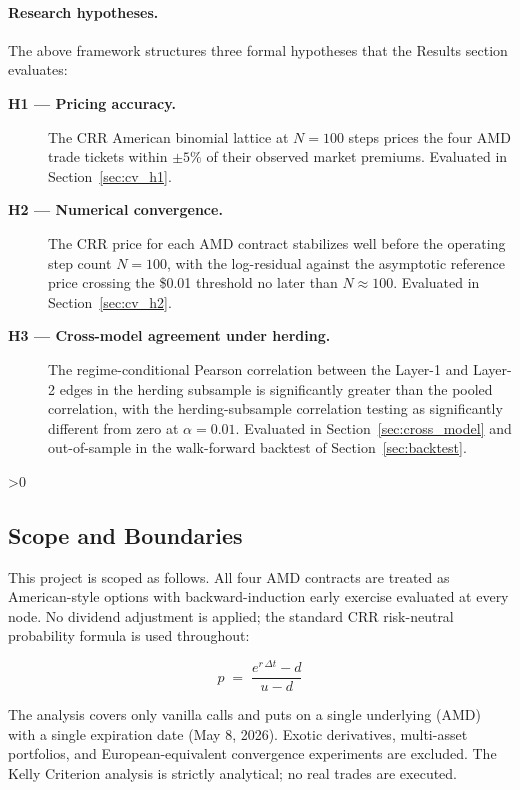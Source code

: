 \documentclass[12pt, letterpaper]{article}
\let\oldsubsection\subsection
\renewcommand{\subsection}{%
  \ifnum\value{subsection}>0 \clearpage\fi
  \oldsubsection
}
\begin{document}
\paragraph{Research hypotheses.} The above framework structures three
formal hypotheses that the Results section evaluates:
\begin{description}
  \item[\textbf{H1 --- Pricing accuracy.}] The CRR American binomial
        lattice at $N = 100$ steps prices the four AMD trade tickets
        within $\pm 5\%$ of their observed market premiums. Evaluated
        in Section~\ref{sec:cv_h1}.
  \item[\textbf{H2 --- Numerical convergence.}] The CRR price for
        each AMD contract stabilizes well before the operating step
        count $N = 100$, with the log-residual against the asymptotic
        reference price crossing the \$0.01 threshold no later than
        $N \approx 100$. Evaluated in Section~\ref{sec:cv_h2}.
  \item[\textbf{H3 --- Cross-model agreement under herding.}] The
        regime-conditional Pearson correlation between the Layer-1
        and Layer-2 edges in the herding subsample is significantly
        greater than the pooled correlation, with the herding-subsample
        correlation testing as significantly different from zero at
        $\alpha = 0.01$. Evaluated in Section~\ref{sec:cross_model}
        and out-of-sample in the walk-forward backtest of
        Section~\ref{sec:backtest}.
\end{description}

\subsection{Scope and Boundaries}

This project is scoped as follows. All four AMD contracts are treated
as American-style options with backward-induction early exercise
evaluated at every node. No dividend adjustment is applied; the
standard CRR risk-neutral probability formula is used throughout:

\begin{equation}
  p \;=\; \frac{e^{r\,\Delta t} - d}{\,u - d\,}
  \label{eq:crr_prob}
\end{equation}

\noindent The analysis covers only vanilla calls and puts on a single
underlying (AMD) with a single expiration date (May 8, 2026). Exotic
derivatives, multi-asset portfolios, and European-equivalent
convergence experiments are excluded. The Kelly Criterion analysis is
strictly analytical; no real trades are executed.
\end{document}
